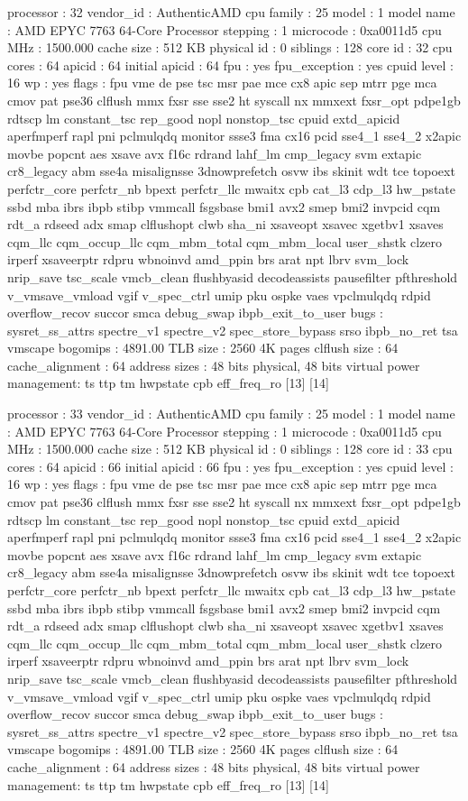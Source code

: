 processor	: 32
vendor_id	: AuthenticAMD
cpu family	: 25
model		: 1
model name	: AMD EPYC 7763 64-Core Processor
stepping	: 1
microcode	: 0xa0011d5
cpu MHz		: 1500.000
cache size	: 512 KB
physical id	: 0
siblings	: 128
core id		: 32
cpu cores	: 64
apicid		: 64
initial apicid	: 64
fpu		: yes
fpu_exception	: yes
cpuid level	: 16
wp		: yes
flags		: fpu vme de pse tsc msr pae mce cx8 apic sep mtrr pge mca cmov pat pse36 clflush mmx fxsr sse sse2 ht syscall nx mmxext fxsr_opt pdpe1gb rdtscp lm constant_tsc rep_good nopl nonstop_tsc cpuid extd_apicid aperfmperf rapl pni pclmulqdq monitor ssse3 fma cx16 pcid sse4_1 sse4_2 x2apic movbe popcnt aes xsave avx f16c rdrand lahf_lm cmp_legacy svm extapic cr8_legacy abm sse4a misalignsse 3dnowprefetch osvw ibs skinit wdt tce topoext perfctr_core perfctr_nb bpext perfctr_llc mwaitx cpb cat_l3 cdp_l3 hw_pstate ssbd mba ibrs ibpb stibp vmmcall fsgsbase bmi1 avx2 smep bmi2 invpcid cqm rdt_a rdseed adx smap clflushopt clwb sha_ni xsaveopt xsavec xgetbv1 xsaves cqm_llc cqm_occup_llc cqm_mbm_total cqm_mbm_local user_shstk clzero irperf xsaveerptr rdpru wbnoinvd amd_ppin brs arat npt lbrv svm_lock nrip_save tsc_scale vmcb_clean flushbyasid decodeassists pausefilter pfthreshold v_vmsave_vmload vgif v_spec_ctrl umip pku ospke vaes vpclmulqdq rdpid overflow_recov succor smca debug_swap ibpb_exit_to_user
bugs		: sysret_ss_attrs spectre_v1 spectre_v2 spec_store_bypass srso ibpb_no_ret tsa vmscape
bogomips	: 4891.00
TLB size	: 2560 4K pages
clflush size	: 64
cache_alignment	: 64
address sizes	: 48 bits physical, 48 bits virtual
power management: ts ttp tm hwpstate cpb eff_freq_ro [13] [14]

processor	: 33
vendor_id	: AuthenticAMD
cpu family	: 25
model		: 1
model name	: AMD EPYC 7763 64-Core Processor
stepping	: 1
microcode	: 0xa0011d5
cpu MHz		: 1500.000
cache size	: 512 KB
physical id	: 0
siblings	: 128
core id		: 33
cpu cores	: 64
apicid		: 66
initial apicid	: 66
fpu		: yes
fpu_exception	: yes
cpuid level	: 16
wp		: yes
flags		: fpu vme de pse tsc msr pae mce cx8 apic sep mtrr pge mca cmov pat pse36 clflush mmx fxsr sse sse2 ht syscall nx mmxext fxsr_opt pdpe1gb rdtscp lm constant_tsc rep_good nopl nonstop_tsc cpuid extd_apicid aperfmperf rapl pni pclmulqdq monitor ssse3 fma cx16 pcid sse4_1 sse4_2 x2apic movbe popcnt aes xsave avx f16c rdrand lahf_lm cmp_legacy svm extapic cr8_legacy abm sse4a misalignsse 3dnowprefetch osvw ibs skinit wdt tce topoext perfctr_core perfctr_nb bpext perfctr_llc mwaitx cpb cat_l3 cdp_l3 hw_pstate ssbd mba ibrs ibpb stibp vmmcall fsgsbase bmi1 avx2 smep bmi2 invpcid cqm rdt_a rdseed adx smap clflushopt clwb sha_ni xsaveopt xsavec xgetbv1 xsaves cqm_llc cqm_occup_llc cqm_mbm_total cqm_mbm_local user_shstk clzero irperf xsaveerptr rdpru wbnoinvd amd_ppin brs arat npt lbrv svm_lock nrip_save tsc_scale vmcb_clean flushbyasid decodeassists pausefilter pfthreshold v_vmsave_vmload vgif v_spec_ctrl umip pku ospke vaes vpclmulqdq rdpid overflow_recov succor smca debug_swap ibpb_exit_to_user
bugs		: sysret_ss_attrs spectre_v1 spectre_v2 spec_store_bypass srso ibpb_no_ret tsa vmscape
bogomips	: 4891.00
TLB size	: 2560 4K pages
clflush size	: 64
cache_alignment	: 64
address sizes	: 48 bits physical, 48 bits virtual
power management: ts ttp tm hwpstate cpb eff_freq_ro [13] [14]


